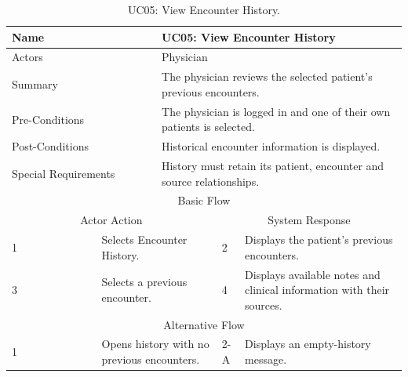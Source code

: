 \begin{table}[htbp]
\centering
\small
\caption{UC05: View Encounter History.}
\label{tab:kashaf:uc05}
\begin{tabular}{|p{}|p{}|p{}|p{}|p{}|}
\hline
\multicolumn{2}{|p{\dimexpr0.225\textwidth+2\tabcolsep+\arrayrulewidth\relax}|}{Name} & \multicolumn{3}{p{\dimexpr0.575\textwidth+4\tabcolsep+2\arrayrulewidth\relax}|}{UC05: View Encounter History} \\ \hline
\multicolumn{2}{|p{\dimexpr0.225\textwidth+2\tabcolsep+\arrayrulewidth\relax}|}{Actors} & \multicolumn{3}{p{\dimexpr0.575\textwidth+4\tabcolsep+2\arrayrulewidth\relax}|}{Physician} \\ \hline
\multicolumn{2}{|p{\dimexpr0.225\textwidth+2\tabcolsep+\arrayrulewidth\relax}|}{Summary} & \multicolumn{3}{p{\dimexpr0.575\textwidth+4\tabcolsep+2\arrayrulewidth\relax}|}{The physician reviews the selected patient's previous encounters.} \\ \hline
\multicolumn{2}{|p{\dimexpr0.225\textwidth+2\tabcolsep+\arrayrulewidth\relax}|}{Pre-Conditions} & \multicolumn{3}{p{\dimexpr0.575\textwidth+4\tabcolsep+2\arrayrulewidth\relax}|}{The physician is logged in and one of their own patients is selected.} \\ \hline
\multicolumn{2}{|p{\dimexpr0.225\textwidth+2\tabcolsep+\arrayrulewidth\relax}|}{Post-Conditions} & \multicolumn{3}{p{\dimexpr0.575\textwidth+4\tabcolsep+2\arrayrulewidth\relax}|}{Historical encounter information is displayed.} \\ \hline
\multicolumn{2}{|p{\dimexpr0.225\textwidth+2\tabcolsep+\arrayrulewidth\relax}|}{Special Requirements} & \multicolumn{3}{p{\dimexpr0.575\textwidth+4\tabcolsep+2\arrayrulewidth\relax}|}{History must retain its patient, encounter and source relationships.} \\ \hline
\multicolumn{5}{|c|}{Basic Flow} \\ \hline
\multicolumn{3}{|c|}{Actor Action} & \multicolumn{2}{c|}{System Response} \\ \hline
1 & \multicolumn{2}{p{\dimexpr0.37\textwidth+2\tabcolsep+\arrayrulewidth\relax}|}{Selects Encounter History.} & 2 & Displays the patient's previous encounters. \\ \hline
3 & \multicolumn{2}{p{\dimexpr0.37\textwidth+2\tabcolsep+\arrayrulewidth\relax}|}{Selects a previous encounter.} & 4 & Displays available notes and clinical information with their sources. \\ \hline
\multicolumn{5}{|c|}{Alternative Flow} \\ \hline
1 & \multicolumn{2}{p{\dimexpr0.37\textwidth+2\tabcolsep+\arrayrulewidth\relax}|}{Opens history with no previous encounters.} & 2-A & Displays an empty-history message. \\ \hline
\end{tabular}
\end{table}

